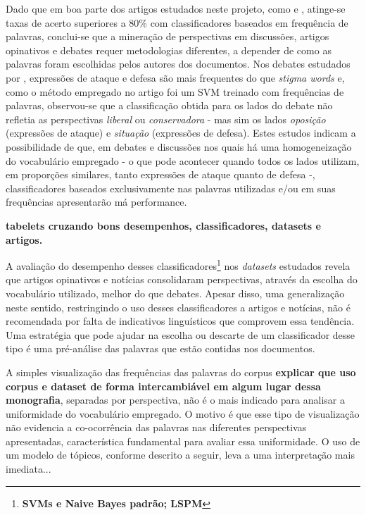 Dado que em boa parte dos artigos estudados neste projeto, como \cite{lin-et-al2006} e \cite{klebanov}, atinge-se taxas de acerto superiores a 80\% com classificadores baseados em frequência de palavras, conclui-se que a mineração de perspectivas em discussões, artigos opinativos e debates requer metodologias diferentes, a depender de como as palavras foram escolhidas pelos autores dos documentos. Nos debates estudados por \cite{hirst-et-al}, expressões de ataque e defesa são mais frequentes do que \emph{stigma words} e, como o método empregado no artigo foi um SVM treinado com frequências de palavras, observou-se que a classificação obtida para os lados do debate não refletia as perspectivas \emph{liberal} ou \emph{conservadora} - mas sim os lados \emph{oposição} (expressões de ataque) e \emph{situação} (expressões de defesa). Estes estudos indicam a possibilidade de que, em debates e discussões nos quais há uma homogeneização do vocabulário empregado - o que pode acontecer quando todos os lados utilizam, em proporções similares, tanto expressões de ataque quanto de defesa -, classificadores baseados exclusivamente nas palavras utilizadas e/ou em suas frequências apresentarão má performance.

\textbf{tabelets cruzando bons desempenhos, classificadores, datasets e artigos.}

A avaliação do desempenho desses classificadores\footnote{\textbf{SVMs e Naive Bayes padrão; LSPM}} nos \emph{datasets} estudados revela que artigos opinativos e notícias consolidaram perspectivas, através da escolha do vocabulário utilizado, melhor do que debates. Apesar disso, uma generalização neste sentido, restringindo o uso desses classificadores a artigos e notícias, não é recomendada por falta de indicativos linguísticos que comprovem essa tendência. Uma estratégia que pode ajudar na escolha ou descarte de um classificador desse tipo é uma pré-análise das palavras que estão contidas nos documentos.

A simples visualização das frequências das palavras do corpus \textbf{explicar que uso corpus e dataset de forma intercambiável em algum lugar dessa monografia}, separadas por perspectiva, não é o mais indicado para analisar a uniformidade do vocabulário empregado. O motivo é que esse tipo de visualização não evidencia a co-ocorrência das palavras nas diferentes perspectivas apresentadas, característica fundamental para avaliar essa uniformidade. O uso de um modelo de tópicos, conforme descrito a seguir, leva a uma interpretação mais imediata... 

